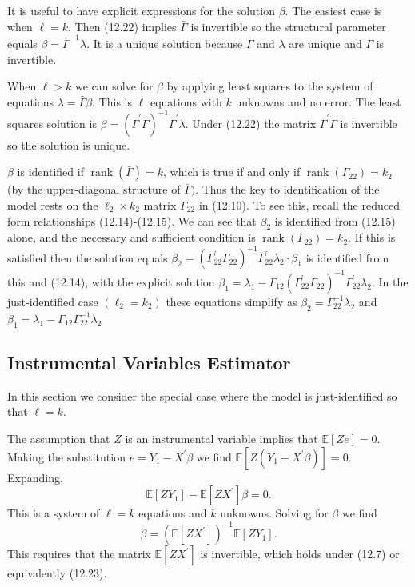 \documentclass[10pt]{article}
\begin{document}
It is useful to have explicit expressions for the solution $\beta$. The easiest case is when $\ell=k$. Then (12.22) implies $\bar{\Gamma}$ is invertible so the structural parameter equals $\beta=\bar{\Gamma}^{-1} \lambda$. It is a unique solution because $\bar{\Gamma}$ and $\lambda$ are unique and $\bar{\Gamma}$ is invertible.

When $\ell>k$ we can solve for $\beta$ by applying least squares to the system of equations $\lambda=\bar{\Gamma} \beta$. This is $\ell$ equations with $k$ unknowns and no error. The least squares solution is $\beta=\left(\bar{\Gamma}^{\prime} \bar{\Gamma}\right)^{-1} \bar{\Gamma}^{\prime} \lambda$. Under (12.22) the matrix $\bar{\Gamma}^{\prime} \bar{\Gamma}$ is invertible so the solution is unique.

$\beta$ is identified if $\operatorname{rank}(\bar{\Gamma})=k$, which is true if and only if $\operatorname{rank}\left(\Gamma_{22}\right)=k_{2}$ (by the upper-diagonal structure of $\bar{\Gamma})$. Thus the key to identification of the model rests on the $\ell_{2} \times k_{2}$ matrix $\Gamma_{22}$ in (12.10). To see this, recall the reduced form relationships (12.14)-(12.15). We can see that $\beta_{2}$ is identified from (12.15) alone, and the necessary and sufficient condition is $\operatorname{rank}\left(\Gamma_{22}\right)=k_{2}$. If this is satisfied then the solution equals $\beta_{2}=\left(\Gamma_{22}^{\prime} \Gamma_{22}\right)^{-1} \Gamma_{22}^{\prime} \lambda_{2} \cdot \beta_{1}$ is identified from this and (12.14), with the explicit solution $\beta_{1}=\lambda_{1}-\Gamma_{12}\left(\Gamma_{22}^{\prime} \Gamma_{22}\right)^{-1} \Gamma_{22}^{\prime} \lambda_{2}$. In the just-identified case $\left(\ell_{2}=k_{2}\right)$ these equations simplify as $\beta_{2}=\Gamma_{22}^{-1} \lambda_{2}$ and $\beta_{1}=\lambda_{1}-\Gamma_{12} \Gamma_{22}^{-1} \lambda_{2}$

\subsection{Instrumental Variables Estimator}
In this section we consider the special case where the model is just-identified so that $\ell=k$.

The assumption that $Z$ is an instrumental variable implies that $\mathbb{E}[Z e]=0$. Making the substitution $e=Y_{1}-X^{\prime} \beta$ we find $\mathbb{E}\left[Z\left(Y_{1}-X^{\prime} \beta\right)\right]=0$. Expanding,
$$
\mathbb{E}\left[Z Y_{1}\right]-\mathbb{E}\left[Z X^{\prime}\right] \beta=0 .
$$
This is a system of $\ell=k$ equations and $k$ unknowns. Solving for $\beta$ we find
$$
\beta=\left(\mathbb{E}\left[Z X^{\prime}\right]\right)^{-1} \mathbb{E}\left[Z Y_{1}\right] .
$$
This requires that the matrix $\mathbb{E}\left[Z X^{\prime}\right]$ is invertible, which holds under (12.7) or equivalently (12.23).
\end{document}
